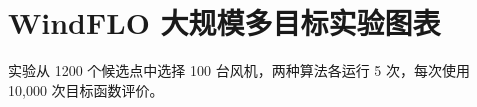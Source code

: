 \documentclass[UTF8,a4paper,11pt]{ctexart}
\begin{document}
\section*{WindFLO 大规模多目标实验图表}

实验从 1200 个候选点中选择 100 台风机，两种算法各运行 5 次，每次使用 10,000 次目标函数评价。


\end{document}

